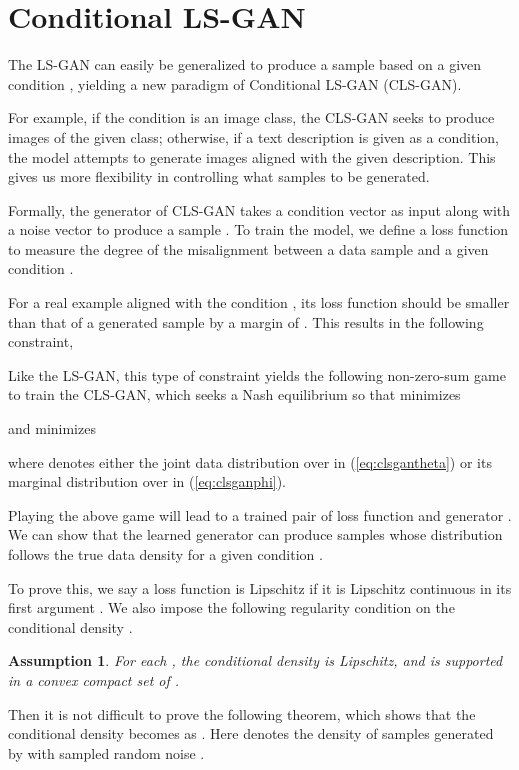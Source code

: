 \documentclass[11pt,fullpage, letterpaper,twoside]{article}
\newtheorem{assumption}{Assumption}
\newcommand{\1}[1]{\mathds{1}_{\left[#1\right]}}
\begin{document}
\section{Conditional LS-GAN}\label{sec:clsgan}
The LS-GAN can easily be generalized to produce a sample based on a given condition , yielding a new paradigm of Conditional LS-GAN (CLS-GAN).

For example, if the condition is an image class, the CLS-GAN seeks to produce images of the given class; otherwise, if a text description is given as a condition, the model attempts to generate images aligned with the given description.  This gives us more flexibility in controlling what samples to be generated.

Formally, the generator of CLS-GAN takes a condition vector  as input along with a noise vector  to produce a sample .
To train the model, we define a loss function  to measure the degree of the misalignment between a data sample  and a given condition .

For a real example  aligned with the condition , its loss function should be smaller than that of a generated sample by a margin of .  This results in the following constraint,







Like the LS-GAN, this type of constraint yields the following non-zero-sum game to train the CLS-GAN, which seeks a Nash equilibrium  so that
 minimizes

and  minimizes

where  denotes either the joint data distribution over  in (\ref{eq:clsgantheta}) or its marginal distribution over  in (\ref{eq:clsganphi}).


Playing the above game will lead to a trained pair of loss function  and generator .
We can show that the learned generator  can produce samples whose distribution follows the true data density  for a given condition .

To prove this, we say a loss function  is Lipschitz if it is Lipschitz continuous in its first argument . We also impose the following regularity condition on the conditional density .
\begin{assumption}\label{asp2}
For each , the conditional density  is Lipschitz, and is supported in a convex compact set of .
\end{assumption}

Then it is not difficult to prove the following theorem, which shows that the conditional density  becomes  as . Here  denotes the density of samples generated by  with sampled random noise .
\end{document}
